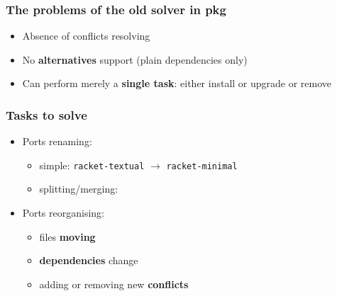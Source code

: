 \documentclass{beamer}
\begin{document}
\begin{frame}
\frametitle{The problems of the old solver in pkg}

\begin{itemize}
\item Absence of conflicts resolving
\item<2-> No \textbf{alternatives} support (plain dependencies only)
\item<3-> Can perform merely a \textbf{single task}: either install or upgrade or remove
\end{itemize}

\end{frame}

\begin{frame}
\frametitle{Tasks to solve}
\begin{itemize}
  \item Ports renaming: 
  \begin{itemize}
    \item simple:
    \texttt{racket-textual} $\rightarrow$ \texttt{racket-minimal}
    \item splitting/merging: 
    \begin{figure}[h!]
	\end{figure}
  \end{itemize}
  \pause
  \item Ports reorganising:
  	\begin{itemize}
    	\item<2-> files \textbf{moving}
    	\item<3-> \textbf{dependencies} change
    	\item<4-> adding or removing new \textbf{conflicts}
    \end{itemize} 

\end{itemize}
\end{frame}
\end{document}
